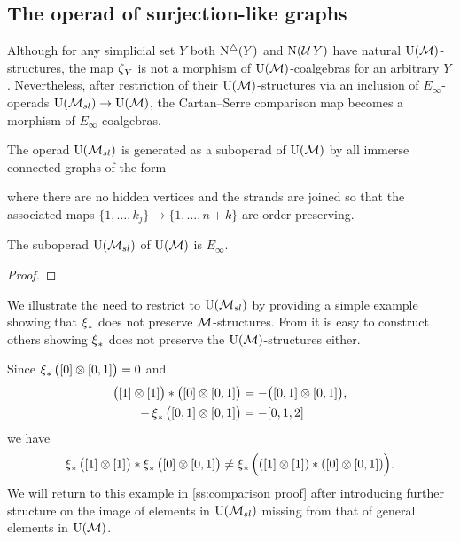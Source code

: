 \subsection{The operad of surjection-like graphs} \label{ss:surjection-like graphs}

Although for any simplicial set $Y$ both $\operatorname{N^{\triangle}}(Y)$ and $\operatorname{N}(\operatorname{\mathcal{U}} Y)$ have natural ${\operatorname{U}(\mathcal{M})}$-structures, the map $\operatorname{\zeta}_Y$ is not a morphism of ${\operatorname{U}(\mathcal{M})}$-coalgebras for an arbitrary $Y$.
Nevertheless, after restriction of their ${\operatorname{U}(\mathcal{M})}$-structures via an inclusion of $E_\infty$-operads ${\operatorname{U}(\mathcal{M}_{sl})} \to {\operatorname{U}(\mathcal{M})}$, the Cartan--Serre comparison map becomes a morphism of $E_\infty$-coalgebras.

The operad ${\operatorname{U}(\mathcal{M}_{sl})}$ is generated as a suboperad of ${\operatorname{U}(\mathcal{M})}$ by all immerse connected graphs of the form

where there are no hidden vertices and the strands are joined so that the associated maps $\{1, \dots, k_j\} \to \{1, \dots, n+k\}$ are order-preserving.

\begin{proposition} \label{p:simplicialandcubical}
	The suboperad ${\operatorname{U}(\mathcal{M}_{sl})}$ of ${\operatorname{U}(\mathcal{M})}$ is $E_\infty$.
\end{proposition}

\begin{proof}
\end{proof}

\begin{example}
	We illustrate the need to restrict to ${\operatorname{U}(\mathcal{M}_{sl})}$ by providing a simple example showing that $\operatorname{\xi}_\ast$ does not preserve $\mathcal{M}$-structures.
	From it is easy to construct others showing $\operatorname{\xi}_\ast$ does not preserve the ${\operatorname{U}(\mathcal{M})}$-structures either.

	Since $\operatorname{\xi}_\ast \big( [0] \otimes [0,1] \big) = 0$ and
	\begin{align*}
	\big( [1] \otimes [1] \big) \ast \big( [0] \otimes [0,1] \big) &=
	- \big( [0,1] \otimes [0,1] \big), \\
	- \operatorname{\xi}_\ast \big( [0,1] \otimes [0,1] \big) & = - [0,1,2]
	\end{align*}
	we have
	\[
	\operatorname{\xi}_\ast \big( [1] \otimes [1] \big) \ast \operatorname{\xi}_\ast \big( [0] \otimes [0,1] \big) \neq \operatorname{\xi}_\ast \Big( ([1] \otimes [1]) \ast ([0] \otimes [0,1]) \Big).
	\]
	We will return to this example in \cref{ss:comparison proof} after introducing further structure on the image of elements in ${\operatorname{U}(\mathcal{M}_{sl})}$ missing from that of general elements in ${\operatorname{U}(\mathcal{M})}$.
\end{example}

